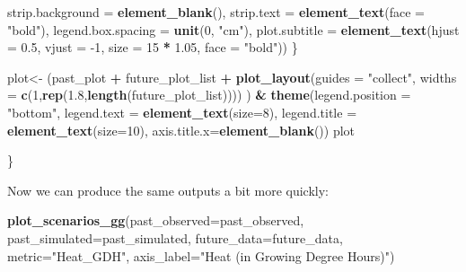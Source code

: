 \documentclass[
]{book}
\newenvironment{Shaded}{\begin{snugshade}}{\end{snugshade}}
\newcommand{\DataTypeTok}[1]{\textcolor[rgb]{0.13,0.29,0.53}{#1}}
\newcommand{\DecValTok}[1]{\textcolor[rgb]{0.00,0.00,0.81}{#1}}
\newcommand{\FloatTok}[1]{\textcolor[rgb]{0.00,0.00,0.81}{#1}}
\newcommand{\KeywordTok}[1]{\textcolor[rgb]{0.13,0.29,0.53}{\textbf{#1}}}
\newcommand{\NormalTok}[1]{#1}
\newcommand{\OperatorTok}[1]{\textcolor[rgb]{0.81,0.36,0.00}{\textbf{#1}}}
\newcommand{\StringTok}[1]{\textcolor[rgb]{0.31,0.60,0.02}{#1}}
\begin{document}
\begin{Shaded}
\begin{Highlighting}[]
            \DataTypeTok{strip.background =} \KeywordTok{element_blank}\NormalTok{(),}
            \DataTypeTok{strip.text =} \KeywordTok{element_text}\NormalTok{(}\DataTypeTok{face =} \StringTok{"bold"}\NormalTok{),}
            \DataTypeTok{legend.box.spacing =} \KeywordTok{unit}\NormalTok{(}\DecValTok{0}\NormalTok{, }\StringTok{"cm"}\NormalTok{),}
            \DataTypeTok{plot.subtitle =} \KeywordTok{element_text}\NormalTok{(}\DataTypeTok{hjust =} \FloatTok{0.5}\NormalTok{,}
                                         \DataTypeTok{vjust =} \DecValTok{-1}\NormalTok{,}
                                         \DataTypeTok{size =} \DecValTok{15} \OperatorTok{*}\StringTok{ }\FloatTok{1.05}\NormalTok{,}
                                         \DataTypeTok{face =} \StringTok{"bold"}\NormalTok{)) }
\NormalTok{  \}}
  
\NormalTok{  plot<-}\StringTok{ }\NormalTok{(past_plot }\OperatorTok{+}
\StringTok{            }\NormalTok{future_plot_list }\OperatorTok{+}
\StringTok{            }\KeywordTok{plot_layout}\NormalTok{(}\DataTypeTok{guides =} \StringTok{"collect"}\NormalTok{,}
                        \DataTypeTok{widths =} \KeywordTok{c}\NormalTok{(}\DecValTok{1}\NormalTok{,}\KeywordTok{rep}\NormalTok{(}\FloatTok{1.8}\NormalTok{,}\KeywordTok{length}\NormalTok{(future_plot_list))))}
\NormalTok{        ) }\OperatorTok{&}\StringTok{ }\KeywordTok{theme}\NormalTok{(}\DataTypeTok{legend.position =} \StringTok{"bottom"}\NormalTok{,}
                  \DataTypeTok{legend.text =} \KeywordTok{element_text}\NormalTok{(}\DataTypeTok{size=}\DecValTok{8}\NormalTok{),}
                  \DataTypeTok{legend.title =} \KeywordTok{element_text}\NormalTok{(}\DataTypeTok{size=}\DecValTok{10}\NormalTok{),}
                  \DataTypeTok{axis.title.x=}\KeywordTok{element_blank}\NormalTok{())}
\NormalTok{  plot}
  
\NormalTok{\}}
\end{Highlighting}
\end{Shaded}

Now we can produce the same outputs a bit more quickly:

\begin{Shaded}
\begin{Highlighting}[]
\KeywordTok{plot_scenarios_gg}\NormalTok{(}\DataTypeTok{past_observed=}\NormalTok{past_observed,}
                  \DataTypeTok{past_simulated=}\NormalTok{past_simulated,}
                  \DataTypeTok{future_data=}\NormalTok{future_data,}
                  \DataTypeTok{metric=}\StringTok{"Heat_GDH"}\NormalTok{,}
                  \DataTypeTok{axis_label=}\StringTok{"Heat (in Growing Degree Hours)"}\NormalTok{)}
\end{Highlighting}
\end{Shaded}
\end{document}
